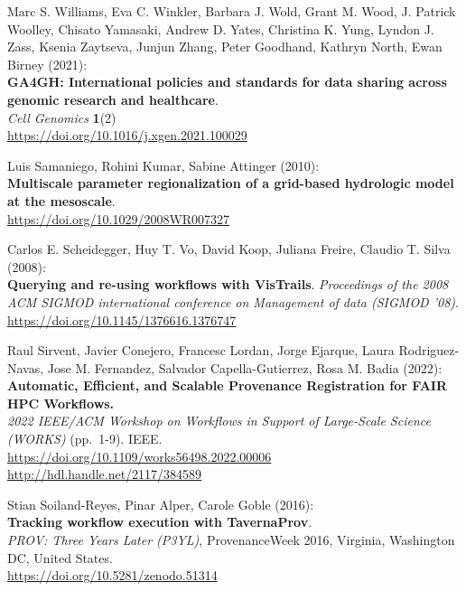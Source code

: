 \documentclass[10pt,letterpaper]{article}
\begin{document}
\begin{thebibliography}{10}
\begin{small}
Marc S. Williams, Eva C. Winkler, Barbara J. Wold, Grant M. Wood, J. Patrick Woolley, Chisato Yamasaki, Andrew D. Yates, Christina K. Yung, Lyndon J. Zass, Ksenia Zaytseva, Junjun Zhang, Peter Goodhand, Kathryn North, Ewan Birney (2021):\\
\textbf{GA4GH: International policies and standards for data sharing
across genomic research and healthcare}.\\
\emph{Cell Genomics} \textbf{1}(2)\\
\url{https://doi.org/10.1016/j.xgen.2021.100029}

Luis Samaniego, Rohini Kumar, Sabine Attinger (2010):\\
\textbf{Multiscale parameter regionalization of a grid-based hydrologic model at the mesoscale}.\\
\url{https://doi.org/10.1029/2008WR007327}


 Carlos E. Scheidegger, Huy T. Vo, David Koop, Juliana Freire, Claudio T. Silva (2008):\\
\textbf{Querying and re-using workflows with VisTrails}.
\emph{Proceedings of the 2008 ACM SIGMOD international conference on Management of data (SIGMOD '08)}.\\
\url{https://doi.org/10.1145/1376616.1376747}

Raul Sirvent, Javier Conejero, Francesc Lordan, Jorge Ejarque, Laura Rodriguez-Navas, Jose M. Fernandez, Salvador Capella-Gutierrez, Rosa M. Badia (2022):\\
\textbf{Automatic, Efficient, and Scalable Provenance Registration for
FAIR HPC Workflows.}\\
\emph{2022 IEEE/ACM Workshop on Workflows in Support of Large-Scale Science (WORKS)} (pp.~1-9). IEEE.\\
\url{https://doi.org/10.1109/works56498.2022.00006}\\
\url{http://hdl.handle.net/2117/384589}


Stian Soiland-Reyes, Pinar Alper, Carole Goble (2016):\\
\textbf{Tracking workflow execution with TavernaProv}.\\
\emph{PROV: Three Years Later (P3YL)}, ProvenanceWeek 2016, Virginia, Washington DC, United States. \\
\url{https://doi.org/10.5281/zenodo.51314}


\end{small}
\end{thebibliography}
\end{document}
